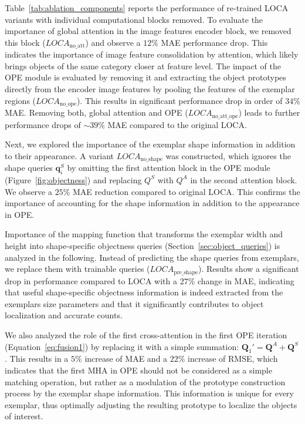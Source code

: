 \documentclass[10pt,twocolumn,letterpaper]{article}
\begin{document}
Table~\ref{tab:ablation_components} reports the performance of re-trained LOCA variants with individual computational blocks removed. 
To evaluate the importance of global attention in the image features encoder block, we removed this block ($LOCA_\mathrm{no\_att}$) and observe a  $12\%$ MAE performance drop. This indicates the importance of image feature consolidation by attention, which likely brings objects of the same category closer at feature level. 
The impact of the OPE module is evaluated by removing it and extracting the object prototypes directly from the encoder image features by pooling the features of the exemplar regions ($LOCA_\mathrm{no\_ope}$). This results in significant performance drop in order of $34\%$ MAE.
Removing both, global attention and OPE ($LOCA_\mathrm{no\_att\_ope}$) leads to further performance drops of $\sim 39\%$ MAE compared to the original LOCA.

Next, we explored the importance of the exemplar shape information in addition to their appearance. A variant $LOCA_\mathrm{no\_shape}$ was constructed, which ignores the shape queries $\mathbf{q}_i^S $ by omitting the first attention block in the OPE module (Figure~\ref{fig:objectness}) and replacing 
$Q^S$ with $Q^A$ in the second attention block. We observe a $25\%$ MAE reduction compared to original LOCA. This confirms the importance of accounting for the shape information in addition to the appearance in OPE.

Importance of the mapping function that transforms the exemplar width and height into shape-specific objectness queries (Section~\ref{sec:object_queries}) is analyzed in the following. 
Instead of predicting the shape queries from exemplars, we replace them with trainable queries ($LOCA_\mathrm{pre\_shape}$). 
Results show a significant drop in performance compared to LOCA with a $27\%$ change in MAE, indicating that useful shape-specific objectness information is indeed extracted from the exemplars size parameters and that it significantly contributes to object localization and accurate counts.

We also analyzed the role of the first cross-attention in the first OPE iteration (Equation~\ref{eq:fusion1}) by replacing it with a simple summation:
$\mathbf{Q}_1' = \mathbf{Q}^{A} + \mathbf{Q}^S$.
This results in a $5\%$ increase of MAE and a $22\%$ increase of RMSE, which indicates that the first MHA in OPE should not be considered as a simple matching operation, but rather as a modulation of the prototype construction process by the exemplar shape information.
This information is unique for every exemplar, thus optimally adjusting the resulting prototype to localize the objects of interest. 
\end{document}
